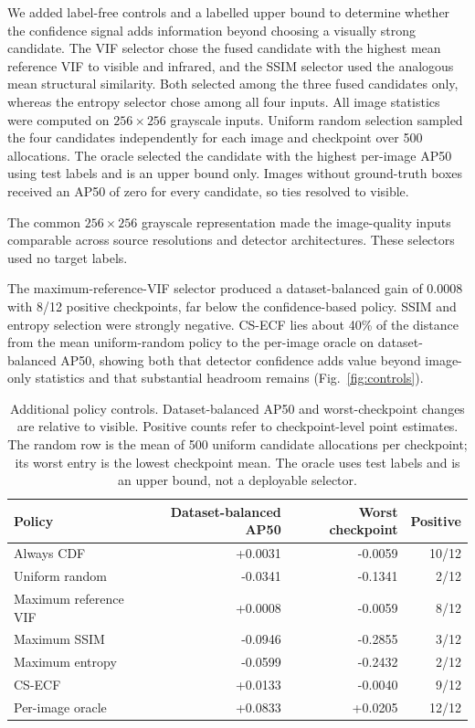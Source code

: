 \documentclass[preprint,11pt]{elsarticle}
\begin{document}
We added label-free controls and a labelled upper bound to determine whether
the confidence signal adds information beyond choosing a visually strong
candidate. The VIF selector chose the fused candidate with the highest mean
reference VIF to visible and infrared, and the SSIM selector used the analogous
mean structural similarity. Both selected among the three fused candidates
only, whereas the entropy selector chose among all four inputs. All image
statistics were computed on \(256\times256\) grayscale inputs. Uniform random
selection sampled the four candidates independently for each image and
checkpoint over 500 allocations. The oracle selected the candidate with the
highest per-image AP50 using test labels and is an upper bound only. Images
without ground-truth boxes received an AP50 of zero for every candidate, so
ties resolved to visible.

The common \(256\times256\) grayscale representation made the image-quality
inputs comparable across source resolutions and detector architectures. These
selectors used no target labels.

The maximum-reference-VIF selector produced a dataset-balanced gain of 0.0008
with 8/12 positive checkpoints, far below the confidence-based policy.
SSIM and entropy selection were strongly negative. CS-ECF lies about 40\% of
the distance from the mean uniform-random policy to the per-image oracle on
dataset-balanced AP50, showing both that detector confidence adds value beyond
image-only statistics and that substantial headroom remains
(Fig.~\ref{fig:controls}).

\begin{table}[t]
\centering
\small
\caption{Additional policy controls. Dataset-balanced AP50 and worst-checkpoint
changes are relative to visible. Positive counts refer to checkpoint-level
point estimates. The random row is the mean of 500 uniform candidate
allocations per checkpoint; its worst entry is the lowest checkpoint mean.
The oracle uses test labels and is an upper bound, not a deployable selector.}
\label{tab:baselines}
\begin{tabular}{@{}lrrr@{}}
\toprule
Policy & Dataset-balanced AP50 & Worst checkpoint & Positive \\
\midrule
Always CDF & +0.0031 & -0.0059 & 10/12 \\
Uniform random & -0.0341 & -0.1341 & 2/12 \\
Maximum reference VIF & +0.0008 & -0.0059 & 8/12 \\
Maximum SSIM & -0.0946 & -0.2855 & 3/12 \\
Maximum entropy & -0.0599 & -0.2432 & 2/12 \\
CS-ECF & +0.0133 & -0.0040 & 9/12 \\
Per-image oracle & +0.0833 & +0.0205 & 12/12 \\
\bottomrule
\end{tabular}
\end{table}
\end{document}
